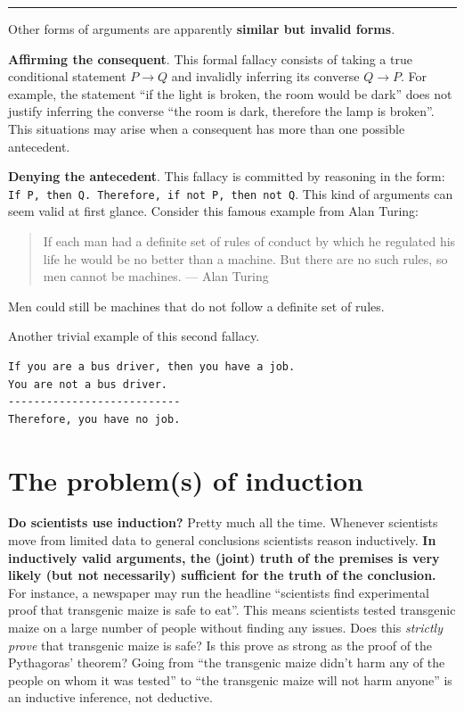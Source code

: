 \documentclass[
]{book}
\begin{document}
\begin{center}\rule{0.5\linewidth}{0.5pt}\end{center}

Other forms of arguments are apparently \textbf{similar but invalid forms}.

\textbf{Affirming the consequent}. This formal fallacy consists of taking a true conditional statement \(P \rightarrow Q\) and invalidly inferring its converse \(Q \rightarrow P\). For example, the statement ``if the light is broken, the room would be dark'' does not justify inferring the converse ``the room is dark, therefore the lamp is broken''. This situations may arise when a consequent has more than one possible antecedent.

\textbf{Denying the antecedent}. This fallacy is committed by reasoning in the form: \texttt{If\ P,\ then\ Q.\ Therefore,\ if\ not\ P,\ then\ not\ Q}. This kind of arguments can seem valid at first glance. Consider this famous example from Alan Turing:

\begin{quote}
If each man had a definite set of rules of conduct by which he regulated his life he would be no better than a machine. But there are no such rules, so men cannot be machines. --- Alan Turing
\end{quote}

Men could still be machines that do not follow a definite set of rules.

Another trivial example of this second fallacy.

\begin{verbatim}
If you are a bus driver, then you have a job.
You are not a bus driver.
---------------------------
Therefore, you have no job.
\end{verbatim}

\hypertarget{problem-induction}{%
\section{The problem(s) of induction}\label{problem-induction}}

\textbf{Do scientists use induction?} Pretty much all the time. Whenever scientists move from limited data to general conclusions scientists reason inductively. \textbf{In inductively valid arguments, the (joint) truth of the premises is very likely (but not necessarily) sufficient for the truth of the conclusion.} For instance, a newspaper may run the headline ``scientists find experimental proof that transgenic maize is safe to eat''. This means scientists tested transgenic maize on a large number of people without finding any issues. Does this \emph{strictly prove} that transgenic maize is safe? Is this prove as strong as the proof of the Pythagoras' theorem? Going from ``the transgenic maize didn't harm any of the people on whom it was tested'' to ``the transgenic maize will not harm anyone'' is an inductive inference, not deductive.
\end{document}
